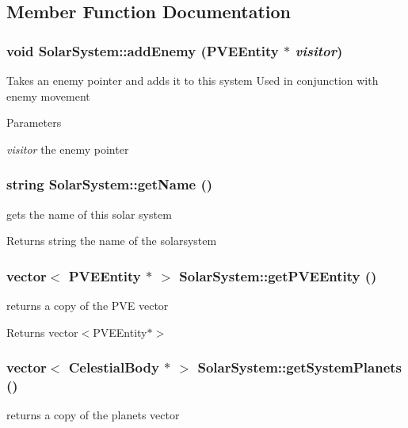 \subsection{Member Function Documentation}
\hypertarget{classSolarSystem_a95839db98d8dbf297536fba1aae7f2a6}{
\subsubsection[{addEnemy}]{\setlength{\rightskip}{0pt plus 5cm}void SolarSystem::addEnemy ({\bf PVEEntity} $\ast$ {\em visitor})}}
\label{df/d5e/classSolarSystem_a95839db98d8dbf297536fba1aae7f2a6}
Takes an enemy pointer and adds it to this system Used in conjunction with enemy movement


\begin{DoxyParams}{Parameters}
\item[{\em visitor}]the enemy pointer \end{DoxyParams}
\hypertarget{classSolarSystem_a8493fd255139bae07453818facfe52ce}{
\subsubsection[{getName}]{\setlength{\rightskip}{0pt plus 5cm}string SolarSystem::getName ()}}
\label{df/d5e/classSolarSystem_a8493fd255139bae07453818facfe52ce}
gets the name of this solar system

\begin{DoxyReturn}{Returns}
string the name of the solarsystem 
\end{DoxyReturn}
\hypertarget{classSolarSystem_a4743c88ee83ef7ae0ed3a308004179bb}{
\subsubsection[{getPVEEntity}]{\setlength{\rightskip}{0pt plus 5cm}vector$<$ {\bf PVEEntity} $\ast$ $>$ SolarSystem::getPVEEntity ()}}
\label{df/d5e/classSolarSystem_a4743c88ee83ef7ae0ed3a308004179bb}
returns a copy of the PVE vector

\begin{DoxyReturn}{Returns}
vector$<$PVEEntity$\ast$$>$ 
\end{DoxyReturn}
\hypertarget{classSolarSystem_a334394234a898ccb7b35ee0f2ab8e648}{
\subsubsection[{getSystemPlanets}]{\setlength{\rightskip}{0pt plus 5cm}vector$<$ {\bf CelestialBody} $\ast$ $>$ SolarSystem::getSystemPlanets ()}}
\label{df/d5e/classSolarSystem_a334394234a898ccb7b35ee0f2ab8e648}
returns a copy of the planets vector

